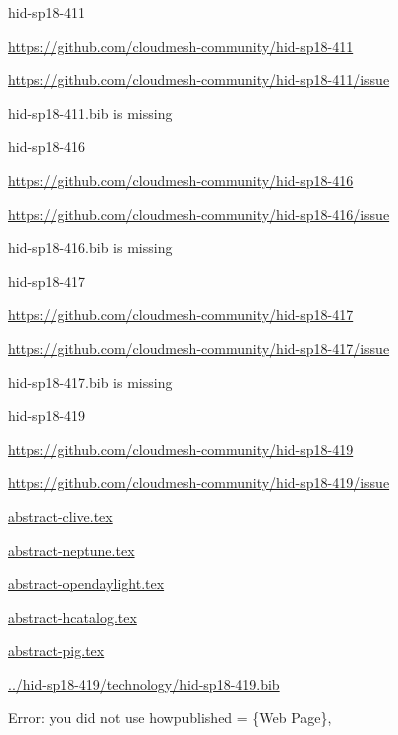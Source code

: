 \begin{IU}

hid-sp18-411

\url{https://github.com/cloudmesh-community/hid-sp18-411}

\url{https://github.com/cloudmesh-community/hid-sp18-411/issue}

hid-sp18-411.bib is missing

\end{IU}


\begin{IU}

hid-sp18-416

\url{https://github.com/cloudmesh-community/hid-sp18-416}

\url{https://github.com/cloudmesh-community/hid-sp18-416/issue}

hid-sp18-416.bib is missing

\end{IU}


\begin{IU}

hid-sp18-417

\url{https://github.com/cloudmesh-community/hid-sp18-417}

\url{https://github.com/cloudmesh-community/hid-sp18-417/issue}

hid-sp18-417.bib is missing

\end{IU}


\begin{IU}

hid-sp18-419

\url{https://github.com/cloudmesh-community/hid-sp18-419}

\url{https://github.com/cloudmesh-community/hid-sp18-419/issue}

\href{https://github.com/cloudmesh-community/hid-sp18-419/blob/master//technology/abstract-clive.tex}{abstract-clive.tex}

\href{https://github.com/cloudmesh-community/hid-sp18-419/blob/master//technology/abstract-neptune.tex}{abstract-neptune.tex}

\href{https://github.com/cloudmesh-community/hid-sp18-419/blob/master//technology/abstract-opendaylight.tex}{abstract-opendaylight.tex}

\href{https://github.com/cloudmesh-community/hid-sp18-419/blob/master//technology/abstract-hcatalog.tex}{abstract-hcatalog.tex}

\href{https://github.com/cloudmesh-community/hid-sp18-419/blob/master//technology/abstract-pig.tex}{abstract-pig.tex}

\href{https://github.com/cloudmesh-community/hid-sp18-419/blob/master//technology/hid-sp18-419.bib}{../hid-sp18-419/technology/hid-sp18-419.bib}

Error: you did not use howpublished = \{Web Page\},

\end{IU}


